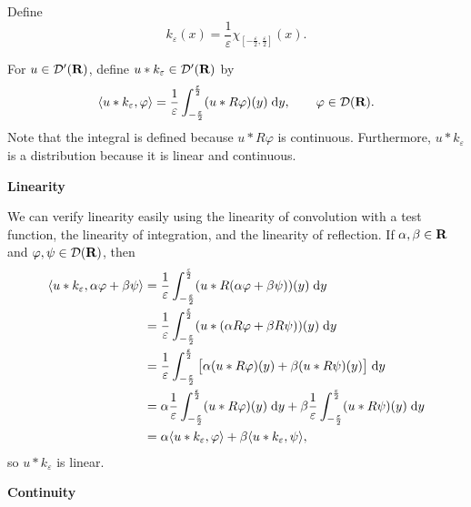\documentclass{homework}
\begin{document}
	\maketitle
	
	Define
	\begin{equation}
		k_\varepsilon(x) = \frac{1}{\varepsilon}\chi_{\left[-\frac{\varepsilon}{2}, \frac{\varepsilon}{2}\right]}(x).
	\end{equation}
	
	\question For $u \in \mathcal{D}'(\textnormal{\bf R})$, define $u * k_\varepsilon \in \mathcal{D}'(\textnormal{\bf R})$ by
	\begin{equation}
		\label{eq:convolution_defn}
		\langle u * k_\varepsilon, \varphi \rangle = \frac{1}{\varepsilon}\int_{-\frac{\varepsilon}{2}}^\frac{\varepsilon}{2}(u * R\varphi)(y)\;\text{d} y, \qquad \varphi \in \mathcal{D}(\textnormal{\bf R}).
	\end{equation}
	Note that the integral is defined because $u * R\varphi$ is continuous. Furthermore, $u*k_\varepsilon$ is a distribution because it is linear and continuous. 
	
	\textbf{Linearity} 
	
	We can verify linearity easily using the linearity of convolution with a test function, the linearity of integration, and the linearity of reflection. If $\alpha, \beta \in \textnormal{\bf R}$ and $\varphi, \psi \in \mathcal{D}(\textnormal{\bf R})$, then
	\begin{align}
		\langle u * k_\varepsilon, \alpha \varphi + \beta \psi \rangle &= \frac{1}{\varepsilon}\int_{-\frac{\varepsilon}{2}}^\frac{\varepsilon}{2} (u * R(\alpha\varphi + \beta\psi))(y)\;\text{d} y \\
		&= \frac{1}{\varepsilon}\int_{-\frac{\varepsilon}{2}}^\frac{\varepsilon}{2} (u * (\alpha R\varphi + \beta R\psi))(y)\;\text{d} y \\
		&= \frac{1}{\varepsilon}\int_{-\frac{\varepsilon}{2}}^\frac{\varepsilon}{2}\big[ \alpha (u * R\varphi)(y) + \beta (u * R\psi)(y)\big] \;\text{d} y \\
		&= \alpha \frac{1}{\varepsilon}\int_{-\frac{\varepsilon}{2}}^\frac{\varepsilon}{2} (u * R\varphi)(y)\;\text{d} y + \beta \frac{1}{\varepsilon}\int_{-\frac{\varepsilon}{2}}^\frac{\varepsilon}{2}(u*R\psi)(y)\;\text{d} y \\
		&= \alpha\langle u * k_\varepsilon, \varphi\rangle + \beta\langle u*k_\varepsilon, \psi\rangle,
	\end{align}
	so $u * k_\varepsilon$ is linear.
	
	\textbf{Continuity}
	
\end{document}
